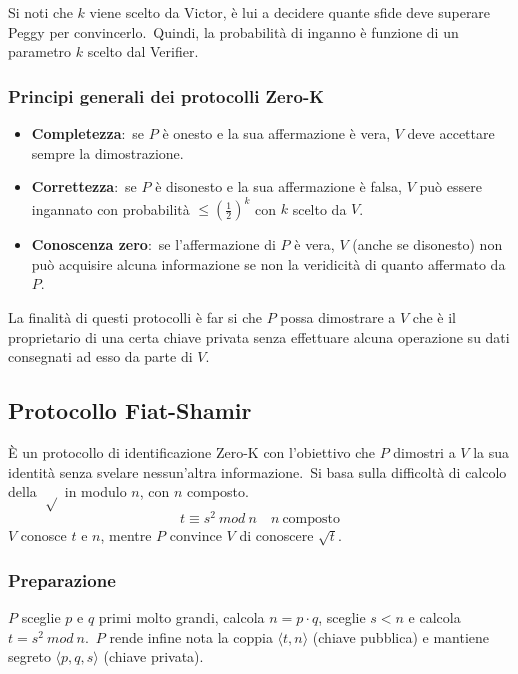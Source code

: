 Si noti che $k$ viene scelto da Victor, è lui a decidere quante sfide deve superare Peggy per convincerlo.\
Quindi, la probabilità di inganno è funzione di un parametro $k$ scelto dal Verifier.

\subsubsection{Principi generali dei protocolli Zero-K}

\begin{itemize}
    \item \textbf{Completezza}:\ se $P$ è onesto e la sua affermazione è vera, $V$ deve accettare sempre la dimostrazione.
    \item \textbf{Correttezza}:\ se $P$ è disonesto e la sua affermazione è falsa, $V$ può essere ingannato con probabilità $\leq \left(\frac{1}{2}\right)^k$ con $k$ scelto da $V$.
    \item \textbf{Conoscenza zero}:\ se l'affermazione di $P$ è vera, $V$ (anche se disonesto) non può acquisire alcuna informazione se non la veridicità di quanto affermato da $P$.
\end{itemize}

\noindent La finalità di questi protocolli è far si che $P$ possa dimostrare a $V$ che è il proprietario di una certa chiave privata senza effettuare alcuna operazione su dati consegnati ad esso da parte di $V$.

\subsection{Protocollo Fiat-Shamir}

È un protocollo di identificazione Zero-K con l'obiettivo che $P$ dimostri a $V$ la sua identità senza svelare nessun'altra informazione.\
Si basa sulla difficoltà di calcolo della $\sqrt[]{}$ in modulo $n$, con $n$ composto.\
\[t \equiv s^2\ \mathit{mod}\ n\quad n\ \mathrm{composto}\]
$V$ conosce $t$ e $n$, mentre $P$ convince $V$ di conoscere $\sqrt{t}$.\

\subsubsection{Preparazione}

$P$ sceglie $p$ e $q$ primi molto grandi, calcola $n = p\cdot q$, sceglie $s < n$ e calcola $t = s^2\ \mathit{mod}\ n$.\
$P$ rende infine nota la coppia $\langle t, n\rangle$ (chiave pubblica) e mantiene segreto $\langle p, q, s\rangle$ (chiave privata).\

